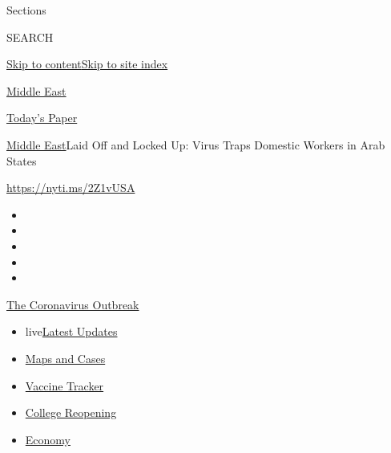 Sections

SEARCH

\protect\hyperlink{site-content}{Skip to
content}\protect\hyperlink{site-index}{Skip to site index}

\href{https://www.nytimes.com/section/world/middleeast}{Middle East}

\href{https://myaccount.nytimes.com/auth/login?response_type=cookie\&client_id=vi}{}

\href{https://www.nytimes.com/section/todayspaper}{Today's Paper}

\href{/section/world/middleeast}{Middle East}\textbar{}Laid Off and
Locked Up: Virus Traps Domestic Workers in Arab States

\url{https://nyti.ms/2Z1vUSA}

\begin{itemize}
\item
\item
\item
\item
\item
\end{itemize}

\href{https://www.nytimes.com/news-event/coronavirus?action=click\&pgtype=Article\&state=default\&region=TOP_BANNER\&context=storylines_menu}{The
Coronavirus Outbreak}

\begin{itemize}
\tightlist
\item
  live\href{https://www.nytimes.com/2020/08/04/world/coronavirus-cases.html?action=click\&pgtype=Article\&state=default\&region=TOP_BANNER\&context=storylines_menu}{Latest
  Updates}
\item
  \href{https://www.nytimes.com/interactive/2020/us/coronavirus-us-cases.html?action=click\&pgtype=Article\&state=default\&region=TOP_BANNER\&context=storylines_menu}{Maps
  and Cases}
\item
  \href{https://www.nytimes.com/interactive/2020/science/coronavirus-vaccine-tracker.html?action=click\&pgtype=Article\&state=default\&region=TOP_BANNER\&context=storylines_menu}{Vaccine
  Tracker}
\item
  \href{https://www.nytimes.com/2020/08/02/us/covid-college-reopening.html?action=click\&pgtype=Article\&state=default\&region=TOP_BANNER\&context=storylines_menu}{College
  Reopening}
\item
  \href{https://www.nytimes.com/live/2020/08/04/business/stock-market-today-coronavirus?action=click\&pgtype=Article\&state=default\&region=TOP_BANNER\&context=storylines_menu}{Economy}
\end{itemize}

